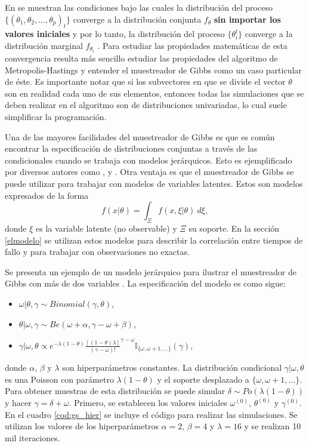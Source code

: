 \documentclass[11pt,a4paper]{article}
\begin{document}
En \citet{geman} se muestran las condiciones bajo las cuales la distribución del proceso $\lbrace (\theta_1, \theta_2, \dots, \theta_p)_t\rbrace$ converge a la distribución conjunta $f_{\theta}$ \textbf{sin importar los valores iniciales} y por lo tanto, la distribución del proceso $\lbrace \theta_i^t \rbrace$ converge a la distribución marginal $f_{\theta_i}$ \citep{gelfand_smith}. Para estudiar las propiedades matemáticas de esta convergencia resulta más sencillo estudiar las propiedades del algoritmo de Metropolis-Hastings y entender el muestreador de Gibbs como un caso particular de éste. Es importante notar que si los subvectores en que se divide el vector $\theta$ son en realidad cada uno de sus elementos, entonces todas las simulaciones que se deben realizar en el algoritmo son de distribuciones univariadas, lo cual suele simplificar la programación.

Una de las mayores facilidades del muestreador de Gibbs es que es común encontrar la especificación de distribuciones conjuntas a través de las condicionales cuando se trabaja con modelos jerárquicos. Esto es ejemplificado por diversos autores como \citet{casella}, \citet{gelman} y \citet{gelfand_smith}. Otra ventaja es que el muestreador de Gibbs se puede utilizar para trabajar con modelos de variables latentes. Estos son modelos expresados de la forma $$f(x| \theta) = \int_\Xi f(x, \xi | \theta) \ d\xi,$$ donde $\xi$ es la variable latente (no observable) y $\Xi$ su soporte. En la sección \ref{elmodelo} se utilizan estos modelos para describir la correlación entre tiempos de fallo y para trabajar con observaciones no exactas.

Se presenta un ejemplo de un modelo jerárquico para ilustrar el muestreador de Gibbs con más de dos variables \citep{casella_gs}. La especificación del modelo es como sigue:
\begin{itemize}
\item $\omega|\theta, \gamma \sim Binomial(\gamma, \theta)$,
\item $\theta | \omega, \gamma \sim Be(\omega + \alpha, \gamma - \omega + \beta)$,
\item $\gamma | \omega, \theta \propto e^{-\lambda(1-\theta)}\frac{[(1-\theta)\lambda]}{(\gamma - \omega)!}^{\gamma - \omega} \mathbb{I}_{\lbrace \omega, \omega + 1, \dots \rbrace}(\gamma),$
\end{itemize}
donde $\alpha$, $\beta$ y $\lambda$ son hiperparámetros constantes. La distribución condicional $\gamma | \omega, \theta$ es una Poisson con parámetro $\lambda(1-\theta)$ y el soporte desplazado a $\lbrace \omega, \omega + 1, \dots \rbrace$. Para obtener muestras de esta distribución se puede simular $\delta \sim Po(\lambda(1-\theta))$ y hacer $\gamma = \delta + \omega$. Primero, se establecen los valores iniciales $\omega^{(0)}$, $\theta^{(0)}$ y $\gamma^{(0)}$. En el cuadro \ref{cod:gs_hier} se incluye el código para realizar las simulaciones. Se utilizan los valores de los hiperparámetros $\alpha = 2$, $\beta = 4$ y $\lambda = 16$ y se realizan 10 mil iteraciones.
\end{document}
